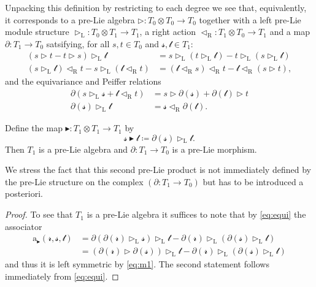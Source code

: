 \documentclass[noamsfonts, reqno]{amsart}
\newcommand{\prelie}{\mathbin{\vartriangleright}}
\newcommand{\preliealt}{\mathbin{\blacktriangleright}}
\newcommand{\laction}{\mathbin{\vartriangleright_{\mathrm{L}}}}
\newcommand{\raction}{\mathbin{\vartriangleleft_{\mathrm{R}}}}
\begin{document}
Unpacking this definition by restricting to each degree we see that, equivalently, it corresponds to a pre-Lie algebra \(\prelie\colon T_0\otimes T_0\to T_0\) together with a left pre-Lie module structure \(\laction\colon T_0\otimes T_1\to T_1\), a right action \(\raction\colon T_1\otimes T_0\to T_1\) and a map \(\partial\colon T_1\to T_0\) satsifying, for all \(s,t\in T_0\) and \(\mathscr{s},\mathscr{t}\in T_1\):
\begin{align}
  (s\prelie t-t\prelie s)\laction\mathscr{t} &= s\laction(t\laction\mathscr{t}) - t\laction(s\laction\mathscr{t})\tag{M1}\label{eq:m1}\\
  (s\laction \mathscr{t})\raction t - s\laction(\mathscr{t}\raction t) &= (\mathscr{t}\raction s)\raction t - \mathscr{t}\raction(s\prelie t)\tag{M2}\label{eq:m2},
\end{align}
and the equivariance and Peiffer relations
\begin{align}
  \partial(s\laction\mathscr{s}+\mathscr{t}\raction t) &= s\prelie\partial(\mathscr{s}) + \partial(\mathscr{t})\prelie t\tag{EQUI}\label{eq:equi}\\
  \partial(\mathscr{s})\laction\mathscr{t} &= \mathscr{s}\raction\partial(\mathscr{t})\tag{PEIF}\label{eq:peif}.
\end{align}

\begin{proposition}
Define the map \(\preliealt\colon T_1\otimes T_1\to T_1\) by
\[
  \mathscr{s}\preliealt\mathscr{t}\coloneqq\partial(\mathscr{s})\laction\mathscr{t}.
\]
Then \(T_1\) is a pre-Lie algebra and \(\partial\colon T_1\to T_0\) is a pre-Lie morphism.
\end{proposition}

We stress the fact that this second pre-Lie product is not immediately defined by the pre-Lie structure on the complex \((\partial\colon T_1\to T_0)\) but has to be introduced a posteriori.

\begin{proof}
  To see that \(T_1\) is a pre-Lie algebra it suffices to note that by \cref{eq:equi} the associator
  \begin{align*}
    \mathrm{a}_{\preliealt}(\mathscr{r},\mathscr{s},\mathscr{t}) &=\partial(\partial(\mathscr{r})\laction\mathscr{s})\laction\mathscr{t}-\partial(\mathscr{r})\laction(\partial(\mathscr{s})\laction\mathscr{t})\\
                                                                 &= (\partial(\mathscr{r})\prelie\partial(\mathscr{s}))\laction\mathscr{t}-\partial(\mathscr{r})\laction(\partial(\mathscr{s})\laction\mathscr{t})
  \end{align*}
  and thus it is left symmetric by \cref{eq:m1}.
  The second statement follows immediately from \cref{eq:equi}.
\end{proof}
\end{document}
